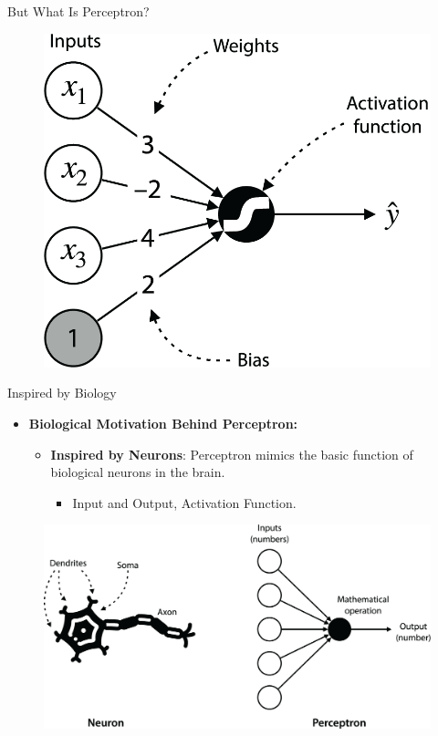 \documentclass[serif, aspectratio=169]{beamer}
\begin{document}
\begin{frame}{But What Is Perceptron?}
\begin{figure}
        \centering
        \includegraphics[width=0.6\linewidth]{pic/Figure_18.png}
    \end{figure}
    \endminipage
\end{frame}


\begin{frame}{Inspired by Biology}
    \begin{itemize}
        \item \textbf{Biological Motivation Behind Perceptron:}
        \medskip
        \begin{itemize}\itemsep1em
            \item \justifying \textbf{Inspired by Neurons}:
            Perceptron mimics the basic function of biological neurons in the brain.
            \begin{itemize}
                \item \justifying Input and Output, Activation Function.
            \end{itemize}
        \end{itemize}
    \end{itemize}
    \begin{figure}
        \centering
        \includegraphics[width=0.55\linewidth]{pic/Figure_19.png}
    \end{figure}
\end{frame}
\end{document}
